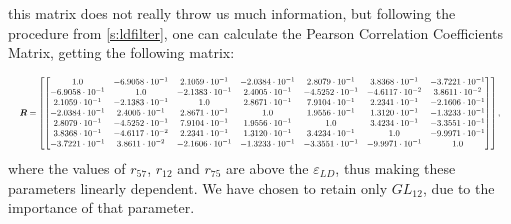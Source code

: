 this matrix does not really throw us much information, but following the procedure from \autoref{s:ldfilter}, one can calculate the Pearson Correlation Coefficients Matrix, getting the following matrix:

\begin{equation}
\resizebox{\textwidth}{!}{$\displaystyle
\boldsymbol{R} =  \left[\begin{bmatrix}
    1.0 & -6.9058 \cdot 10^{-1} & 2.1059 \cdot 10^{-1} & -2.0384 \cdot 10^{-1} & 2.8079 \cdot 10^{-1} & 3.8368 \cdot 10^{-1} & -3.7221 \cdot 10^{-1} \\
    -6.9058 \cdot 10^{-1} & 1.0 & -2.1383 \cdot 10^{-1} & 2.4005 \cdot 10^{-1} & -4.5252 \cdot 10^{-1} & -4.6117 \cdot 10^{-2} & 3.8611 \cdot 10^{-2} \\
    2.1059 \cdot 10^{-1} & -2.1383 \cdot 10^{-1} & 1.0 & 2.8671 \cdot 10^{-1} & 7.9104 \cdot 10^{-1} & 2.2341 \cdot 10^{-1} & -2.1606 \cdot 10^{-1} \\
    -2.0384 \cdot 10^{-1} & 2.4005 \cdot 10^{-1} & 2.8671 \cdot 10^{-1} & 1.0 & 1.9556 \cdot 10^{-1} & 1.3120 \cdot 10^{-1} & -1.3233 \cdot 10^{-1} \\
    2.8079 \cdot 10^{-1} & -4.5252 \cdot 10^{-1} & 7.9104 \cdot 10^{-1} & 1.9556 \cdot 10^{-1} & 1.0 & 3.4234 \cdot 10^{-1} & -3.3551 \cdot 10^{-1} \\
    3.8368 \cdot 10^{-1} & -4.6117 \cdot 10^{-2} & 2.2341 \cdot 10^{-1} & 1.3120 \cdot 10^{-1} & 3.4234 \cdot 10^{-1} & 1.0 & -9.9971 \cdot 10^{-1} \\
    -3.7221 \cdot 10^{-1} & 3.8611 \cdot 10^{-2} & -2.1606 \cdot 10^{-1} & -1.3233 \cdot 10^{-1} & -3.3551 \cdot 10^{-1} & -9.9971 \cdot 10^{-1} & 1.0
  \end{bmatrix}\right],
  $}
\end{equation}
where the values of $r_{57}$, $r_{12}$ and $r_{75}$ are above the $\varepsilon_{LD}$, thus making these parameters linearly dependent. We have chosen to retain only $GL_{12}$, due to the importance of that parameter.

